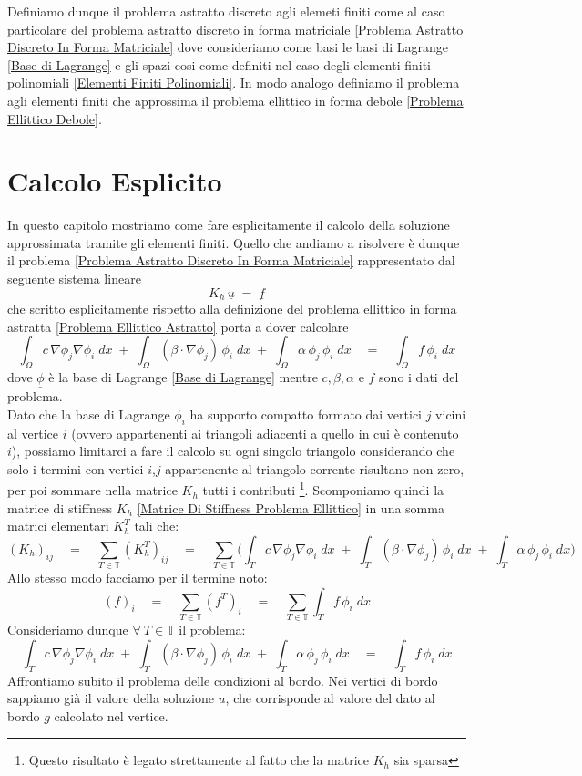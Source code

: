 \documentclass[12pt,a4paper]{report}
\theoremstyle{theorem}
\theoremstyle{definition}
\begin{document}
Definiamo dunque il problema astratto discreto agli elemeti finiti come al caso particolare del problema astratto discreto in forma matriciale \ref{Problema Astratto Discreto In Forma Matriciale} dove consideriamo come basi le basi di Lagrange \ref{Base di Lagrange} e gli spazi cosi come definiti nel caso degli elementi finiti polinomiali \ref{Elementi Finiti Polinomiali}. In modo analogo definiamo il problema agli elementi finiti che approssima il problema ellittico in forma debole \ref{Problema Ellittico Debole}.

\chapter{Calcolo Esplicito}
In questo capitolo mostriamo come fare esplicitamente il calcolo della soluzione approssimata tramite gli elementi finiti. Quello che andiamo a risolvere è dunque il problema \ref{Problema Astratto Discreto In Forma Matriciale} rappresentato dal seguente sistema lineare
\[ K_{h} \, \underline{u} \; = \; \underline{f} \]
che scritto esplicitamente rispetto alla definizione del problema ellittico in forma astratta \ref{Problema Ellittico Astratto} porta a dover calcolare
\[\int_{\Omega}{c \, \nabla \phi_{j} \nabla \phi_{i} \; dx} \; + \; \int_{\Omega}{(\beta \cdot \nabla \phi_{j}) \, \phi_{i} \; dx} \; + \; \int_{\Omega}{\alpha \, \phi_{j} \, \phi_{i} \; dx} \quad = \quad \int_{\Omega}{f \, \phi_{i} \; dx}\]
dove $\underline{\phi}$ è la base di Lagrange \ref{Base di Lagrange} mentre $c, \beta, \alpha$ e $f$ sono i dati del problema.\\
Dato che la base di Lagrange ${\phi}_{i}$ ha supporto compatto formato dai vertici $j$ vicini al vertice $i$ (ovvero appartenenti ai triangoli adiacenti a quello in cui è contenuto $i$), possiamo limitarci a fare il calcolo su ogni singolo triangolo considerando che solo i termini con vertici $i$,$j$ appartenente al triangolo corrente risultano non zero, per poi sommare nella matrice $K_{h}$ tutti i contributi \footnote{Questo risultato è legato strettamente al fatto che la matrice $K_{h}$ sia sparsa}. Scomponiamo quindi la matrice di stiffness $K_{h}$ \ref{Matrice Di Stiffness Problema Ellittico} in una somma matrici elementari $K_{h}^{T}$ tali che:
\[ (K_{h})_{ij} \quad = \quad \sum_{T \in \mathbb{T}}{(K_{h}^T)_{ij}} \quad = \quad \sum_{T \in \mathbb{T}} \bigg(  \int_{T}{c \, \nabla \phi_{j} \nabla \phi_{i} \; dx} \; + \; \int_{T}{(\beta \cdot \nabla \phi_{j}) \, \phi_{i} \; dx} \; + \; \int_{T}{\alpha \, \phi_{j} \, \phi_{i} \; dx} \bigg)\]
Allo stesso modo facciamo per il termine noto:
\[ (f)_{i} \quad = \quad \sum_{T \in \mathbb{T}}{(f^T)_{i}} \quad = \quad \sum_{T \in \mathbb{T}} \int_{T}{f \, \phi_{i} \; dx}\]
Consideriamo dunque $\forall \ T \in \mathbb{T}$ il problema:
\[ \int_{T}{c \, \nabla \phi_{j} \nabla \phi_{i} \; dx} \; + \; \int_{T}{(\beta \cdot \nabla \phi_{j}) \, \phi_{i} \; dx} \; + \; \int_{T}{\alpha \, \phi_{j} \, \phi_{i} \; dx} \quad = \quad \int_{T}{f \, \phi_{i} \; dx}\]
Affrontiamo subito il problema delle condizioni al bordo. Nei vertici di bordo sappiamo già il valore della soluzione $u$, che corrisponde al valore del dato al bordo $g$ calcolato nel vertice.
\end{document}
